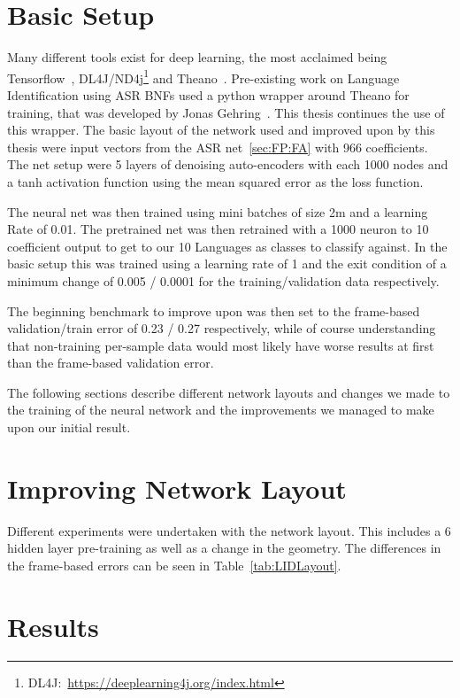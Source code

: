 \section{Basic Setup}
\label{sec:LIDNetwork:Basic}

Many different tools exist for deep learning, the most acclaimed being Tensorflow~\cite{DBLP:journals/corr/AbadiABBCCCDDDG16}, DL4J/ND4j\footnote{DL4J:~\url{https://deeplearning4j.org/index.html}} and Theano~\cite{bergstra2011theano}. Pre-existing work on Language Identification using ASR BNFs used a python wrapper around Theano for training, that was developed by Jonas Gehring~\cite{gehringMA}. This thesis continues the use of this wrapper. The basic layout of the network used and improved upon by this thesis were input vectors from the ASR net~\ref{sec:FP:FA} with 966 coefficients. The net setup were 5 layers of denoising auto-encoders with each 1000 nodes and a tanh activation function using the mean squared error as the loss function. 

The neural net was then trained using mini batches of size 2m and a learning Rate of 0.01. The pretrained net was then retrained with a 1000 neuron to 10 coefficient output to get to our 10 Languages as classes to classify against. In the basic setup this was trained using a learning rate of 1 and the exit condition of a minimum change of 0.005 / 0.0001 for the training/validation data respectively.

The beginning benchmark to improve upon was then set to the frame-based validation/train error of 0.23 / 0.27 respectively, while of course understanding that non-training per-sample data would most likely have worse results at first than the frame-based validation error.

The following sections describe different network layouts and changes we made to the training of the neural network and the improvements we managed to make upon our initial result.

\section{Improving Network Layout}
\label{sec:LIDNetwork:Layout}

Different experiments were undertaken with the network layout. This includes a 6 hidden layer pre-training as well as a change in the geometry. The differences in the frame-based errors can be seen in Table~\ref{tab:LIDLayout}. 

\section{Results}
\label{sec:LIDNetwork:Results}


